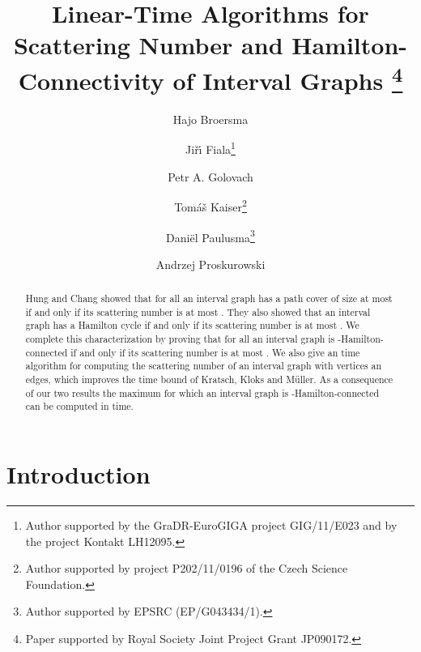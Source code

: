 \documentclass{llncs}
\begin{document}
\title{Linear-Time Algorithms for Scattering Number and Hamilton-Connectivity of Interval Graphs
\thanks{Paper supported by Royal Society Joint Project Grant JP090172.}}


\author
{Hajo Broersma 
\and 
Ji\v{r}\'{\i} Fiala\thanks{Author supported by the GraDR-EuroGIGA project GIG/11/E023 and by the project Kontakt LH12095.} 
\and
Petr A. Golovach  
\and 
Tom\'a\v{s} Kaiser\thanks{Author supported by project P202/11/0196 of the Czech Science Foundation.}  
\and 
Dani\"el Paulusma\thanks{Author supported by EPSRC (EP/G043434/1).}  
\and Andrzej Proskurowski
}


\maketitle


\begin{abstract}\noindent
Hung and Chang showed that for all  an interval graph has a path cover of size at most  if and only if its scattering number is at 
most . They also showed that an interval graph has a Hamilton cycle if and only if its scattering number is at most .
We complete this characterization by proving that for all  an interval graph is -Hamilton-connected if and only if its scattering number is at most . 
We also give an  time algorithm for computing the scattering number of an interval graph with  vertices an  edges, which improves the  time bound of Kratsch, Kloks and M\"uller.  
As a consequence of our two results the maximum  for  which an interval graph is -Hamilton-connected can be computed in  time. 
\end{abstract}

\section{Introduction}\label{s:intro}
\end{document}
